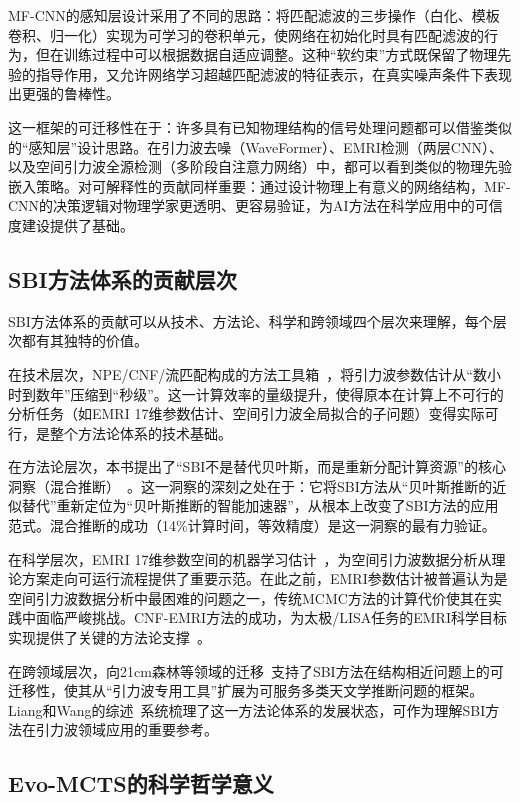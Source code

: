 MF-CNN的感知层设计采用了不同的思路：将匹配滤波的三步操作（白化、模板卷积、归一化）实现为可学习的卷积单元，使网络在初始化时具有匹配滤波的行为，但在训练过程中可以根据数据自适应调整。这种“软约束”方式既保留了物理先验的指导作用，又允许网络学习超越匹配滤波的特征表示，在真实噪声条件下表现出更强的鲁棒性。

这一框架的可迁移性在于：许多具有已知物理结构的信号处理问题都可以借鉴类似的“感知层”设计思路。在引力波去噪（WaveFormer）、EMRI检测（两层CNN）、以及空间引力波全源检测（多阶段自注意力网络）中，都可以看到类似的物理先验嵌入策略。对可解释性的贡献同样重要：通过设计物理上有意义的网络结构，MF-CNN的决策逻辑对物理学家更透明、更容易验证，为AI方法在科学应用中的可信度建设提供了基础。

\subsection{SBI方法体系的贡献层次}

SBI方法体系的贡献可以从技术、方法论、科学和跨领域四个层次来理解，每个层次都有其独特的价值。

在技术层次，NPE/CNF/流匹配构成的方法工具箱~\cite{wang2022normflow,du2024normflow,liang2024cnfmbhb,liang2024cnfemri}，将引力波参数估计从“数小时到数年”压缩到“秒级”。这一计算效率的量级提升，使得原本在计算上不可行的分析任务（如EMRI 17维参数估计、空间引力波全局拟合的子问题）变得实际可行，是整个方法论体系的技术基础。

在方法论层次，本书提出了“SBI不是替代贝叶斯，而是重新分配计算资源”的核心洞察（混合推断）~\cite{sun2025cvae}。这一洞察的深刻之处在于：它将SBI方法从“贝叶斯推断的近似替代”重新定位为“贝叶斯推断的智能加速器”，从根本上改变了SBI方法的应用范式。混合推断的成功（14\%计算时间，等效精度）是这一洞察的最有力验证。

在科学层次，EMRI 17维参数空间的机器学习估计~\cite{liang2024cnfemri}，为空间引力波数据分析从理论方案走向可运行流程提供了重要示范。在此之前，EMRI参数估计被普遍认为是空间引力波数据分析中最困难的问题之一，传统MCMC方法的计算代价使其在实践中面临严峻挑战。CNF-EMRI方法的成功，为太极/LISA任务的EMRI科学目标实现提供了关键的方法论支撑~\cite{wang2024challenges,du2026taiji}。

在跨领域层次，向21cm森林等领域的迁移~\cite{sun2025_21cm}支持了SBI方法在结构相近问题上的可迁移性，使其从“引力波专用工具”扩展为可服务多类天文学推断问题的框架。Liang和Wang的综述~\cite{liang2026sbireview}系统梳理了这一方法论体系的发展状态，可作为理解SBI方法在引力波领域应用的重要参考。

\subsection{Evo-MCTS的科学哲学意义}

